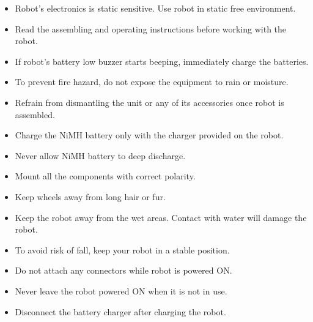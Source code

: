 \documentclass[a4paper,10pt,oneside]{article}
\begin{document}
{\begin{itemize}
	\item  Robot’s electronics is static sensitive. Use robot in static free environment.
	\item Read the assembling and operating instructions before working with the robot.
	\item If robot’s battery low buzzer starts beeping, immediately charge the batteries.
	\item To prevent fire hazard, do not expose the equipment to rain or moisture.
	\item Refrain from dismantling the unit or any of its accessories once robot is assembled.
	\item Charge the NiMH battery only with the charger provided on the robot.
	\item Never allow NiMH battery to deep discharge.
	\item Mount all the components with correct polarity.
	\item Keep wheels away from long hair or fur.
	\item Keep the robot away from the wet areas. Contact with water will damage the robot.
	\item To avoid risk of fall, keep your robot in a stable position.
	\item Do not attach any connectors while robot is powered ON.
	\item Never leave the robot powered ON when it is not in use.
	\item Disconnect the battery charger after charging the robot. 
\end{itemize}
}
\end{document}
